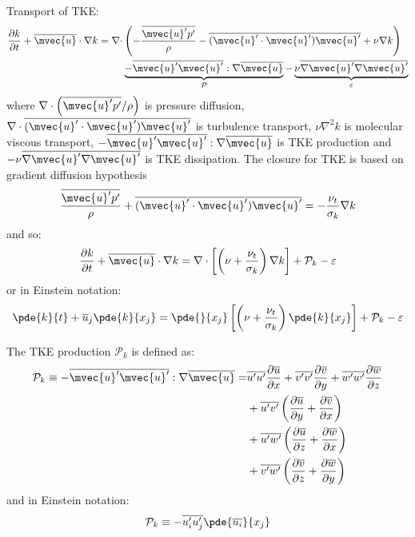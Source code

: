 Transport of TKE:
\begin{equation}
\begin{split}
\frac{\partial k}{\partial t} + \overline{\mvec{u}}\cdot\nabla k = \nabla \cdot &\left( - \frac{\overline{\mvec{u}'p'}}{\rho}- \overline{(\mvec{u}'\cdot\mvec{u}')\mvec{u}'} + \nu \nabla k\right) \\
&\underbrace{ - \overline{\mvec{u}'\mvec{u}'}:\nabla\overline{\mvec{u}}}_{\mathcal{P}} - \underbrace{ \nu \overline{\nabla \mvec{u}'\nabla \mvec{u}'} }_{\varepsilon}
\end{split}
\end{equation}
where $\nabla \cdot \left( \overline{\mvec{u}'p'} / \rho \right)$ is pressure diffusion, $\nabla \cdot \overline{(\mvec{u}'\cdot\mvec{u}')\mvec{u}'}$ is turbulence transport, $\nu\nabla^2k$ is molecular viscous transport, $- \overline{\mvec{u}'\mvec{u}'}:\nabla\overline{\mvec{u}}$ is TKE production and $-\nu \overline{\nabla \mvec{u}'\nabla \mvec{u}'}$ is TKE dissipation. The closure for TKE is based on gradient diffusion hypothesis
\begin{equation}
\frac{\overline{\mvec{u}'p'}}{\rho} + \overline{(\mvec{u}'\cdot\mvec{u}')\mvec{u}'} = - \frac{\nu_t}{\sigma_k} \nabla k
\end{equation}
and so:
\begin{equation}
\frac{\partial k}{\partial t} + \overline{\mvec{u}}\cdot\nabla k = \nabla \cdot \left[ \left( \nu + \frac{\nu_t}{\sigma_k} \right) \nabla k\right] + \mathcal{P}_k - \varepsilon
\end{equation}
or in Einstein notation:
\begin{equation}
\pde{k}{t} + \overline{u}_j\pde{k}{x_j} = \pde{}{x_j}\left[\left( \nu + \frac{\nu_t}{\sigma_k} \right) \pde{k}{x_j}\right] + \mathcal{P}_k - \varepsilon
\end{equation}

The TKE production $\mathcal{P}_k$ is defined as:
\begin{equation}
\begin{split}
\mathcal{P}_k \equiv  - \overline{\mvec{u}'\mvec{u}'}:\nabla\overline{\mvec{u}} =& \overline{u'u'}\frac{\partial \overline{u}}{\partial x} + \overline{v'v'}\frac{\partial \overline{v}}{\partial y} + \overline{w'w'}\frac{\partial \overline{w}}{\partial z}\\
&+ \overline{u'v'} \left( \frac{\partial \overline{u}}{\partial y} + \frac{\partial \overline{v}}{\partial x}  \right)\\
&+ \overline{u'w'} \left( \frac{\partial \overline{u}}{\partial z}  + \frac{\partial \overline{w}}{\partial x}  \right)\\
&+ \overline{v'w'} \left( \frac{\partial \overline{v}}{\partial z}  + \frac{\partial \overline{w}}{\partial y}  \right)
\end{split}
\end{equation}
and in Einstein notation:
\begin{equation}
\mathcal{P}_k \equiv - \overline{u'_i u'_j}\pde{\overline{u_i}}{x_j}
\end{equation}


